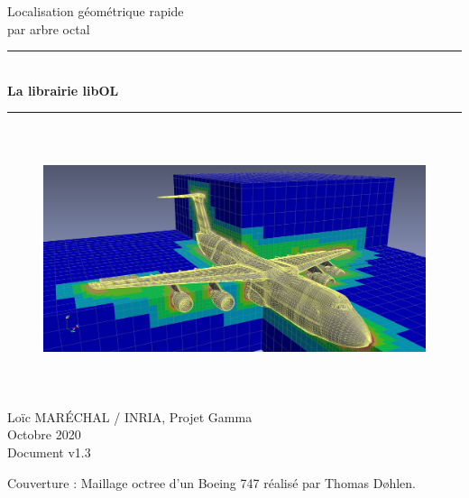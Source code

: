 \documentclass[a4paper,12pt]{article}
\newcommand{\HRule}{\rule{\linewidth}{1mm}}
\begin{document}
%
%

\begin{titlepage}

\begin{center}
\huge Localisation géométrique rapide \\ par arbre octal
\HRule \\
\medskip
{\Huge \bfseries La librairie libOL} \\
\HRule
\end{center}


\begin{figure}[htbp]
\begin{center}
\includegraphics[height=7.8cm]{octree_mesh.png}
\end{center}
\end{figure}


\begin{flushright}
\Large Lo\"ic MAR\'ECHAL / INRIA, Projet Gamma\\
\Large Octobre 2020 \\
\normalsize Document v1.3
\end{flushright}

\end{titlepage}

\clearpage

\setcounter{tocdepth}{2}
\tableofcontents
\vfill

\footnotesize{Couverture : Maillage octree d'un Boeing 747 réalisé par Thomas Døhlen.}
\normalsize

\clearpage


%
%
\end{document}
